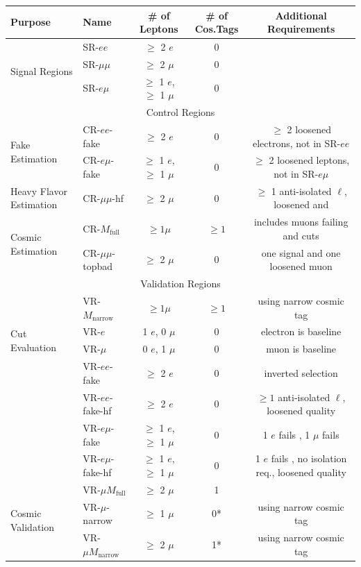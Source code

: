 \begin{table}
\small
\begin{center}
\begin{tabular}{l|l|c|c|c}
Purpose & Name & \# of Leptons & \# of Cos.Tags & Additional Requirements\\
\hline
\multirow{3}{*}{Signal Regions} & SR-$ee$ 	& $\geq$ 2 $e$ 						& 0  & \\
								& SR-$\mu\mu$ & $\geq$ 2 $\mu$ 					& 0  & \\
								& SR-$e\mu$ 	& $\geq$ 1 $e$, $\geq$ 1 $\mu$  & 0  & \\
\hline
\multicolumn{5}{c}{Control Regions} \\
\hline
\multirow{2}{*}{Fake Estimation} 	&CR-$ee$-fake		& $\geq$ 2 $e$					& 0		& $\geq$ 2 loosened electrons, not in SR-$ee$  \\
									&CR-$e\mu$-fake		& $\geq$ 1 $e$, $\geq$ 1 $\mu$ 	& 0		& $\geq$ 2 loosened leptons, not in SR-$e\mu$  \\
\hline
Heavy Flavor Estimation 			&CR-$\mu\mu$-hf		& $\geq$ 2 $\mu$				& 0 	& $\geq$ 1 anti-isolated $\ell$, loosened \pt and \dz \\
\hline
\multirow{2}{*}{Cosmic Estimation} 	&CR-$M_{\mathrm{full}}$  & $\geq 1 \mu$		& $\geq 1$ 	    &  includes muons failing \nphi and \nprecision cuts\\
									&CR-$\mu\mu$-topbad	& $\geq$ 2 $\mu$				& 0  	& one signal and one loosened muon \\
\hline
\multicolumn{5}{c}{Validation Regions} \\
\hline
\multirow{4}{*}{Cut Evaluation}		&VR-$M_{\mathrm{narrow}}$& $\geq 1 \mu$		& $\geq 1$ 	& using narrow cosmic tag \\ 
									&VR-$e$					& 1 $e$, 0 $\mu$	& 0 		& electron is baseline  \\
									&VR-$\mu$				& 0 $e$, 1 $\mu$	& 0 		& muon is baseline  \\   
\hline
\multirow{4}{*}{Fake Validation}	&VR-$ee$-fake			& $\geq$ 2 $e$					& 0 & inverted \dpt selection \\
									&VR-$ee$-fake-hf		& $\geq$ 2 $e$					& 0 & $\geq 1$ anti-isolated $\ell$, loosened quality  \\
									&VR-$e\mu$-fake			& $\geq$ 1 $e$, $\geq$ 1 $\mu$ 	& 0 & 1 $e$ fails \dpt, 1 $\mu$ fails \chiCB \\ 
									&VR-$e\mu$-fake-hf		& $\geq$ 1 $e$, $\geq$ 1 $\mu$	& 0 & 1 $e$ fails \dpt, no isolation req., loosened quality \\
\hline
\multirow{3}{*}{Cosmic Validation}	&VR-$\mu M_{\mathrm{full}}$  & $\geq$ 2 $\mu$			& 1 	& \\		
									&VR-$\mu$-narrow 			& $\geq$ 1 $\mu$			& 0* 	& using narrow cosmic tag \\
									&VR-$\mu M_{\mathrm{narrow}}$& $\geq$ 2 $\mu$			& 1* 	& using narrow cosmic tag \\


\end{tabular}
\end{center}
\end{table}
